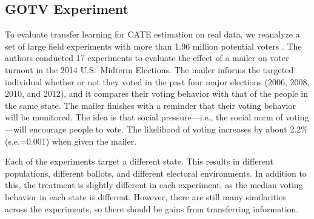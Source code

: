 






\subsection{GOTV Experiment} \label{section:GOTV}



To evaluate transfer learning for CATE estimation on real data, we reanalyze a set of large field experiments with more than 1.96 million potential voters \citep{gerber2017generalizability}. The authors conducted 17 experiments to evaluate the effect of a mailer on voter turnout in the 2014 U.S.\ Midterm Elections. 
The mailer informs the targeted individual whether or not they voted in the past four major elections (2006, 2008, 2010, and 2012), and it compares their voting behavior with that of the people in the same state. The mailer finishes with a reminder that their voting behavior will be monitored. The idea is that social pressure---i.e., the social norm of voting---will encourage people to vote. 
The likelihood of voting increases by about 2.2\% (s.e.=0.001) when given the mailer.


Each of the experiments target a different state. This results in different populations, different ballots, and different electoral environments. In addition to this, the treatment is slightly different in each experiment, as the median voting behavior in each state is different.
However, there are still many similarities across the experiments, so there should be gains from transferring information. %

